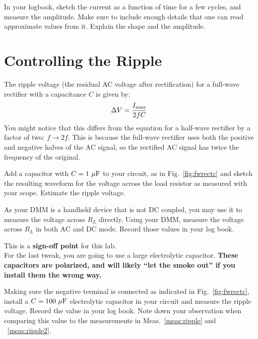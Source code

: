 \begin{measurement}
In your logbook, sketch the current as a function of time for a few
cycles, and measure the amplitude. Make sure to include enough details
that one can read approximate values from it.  Explain the shape and
the amplitude.
\end{measurement}


\section{Controlling the Ripple}

The ripple voltage (the residual AC voltage after rectification) 
for a full-wave rectifier with a capacitance $C$ is given by:
\begin{displaymath}
\Delta V = \frac{I_{\rm max}}{2 f C}
\end{displaymath}
You might notice that this differs from the equation for a half-wave
rectifier by a factor of two: $f \to 2 f$.  This is because the
full-wave rectifier uses both the positive and negative halves of the
AC signal, so the rectified AC signal has twice the frequency of the
original.

\begin{measurement} \label{meas:ripple}
Add a capacitor with $C=1~\rm{\mu F}$ to your circuit, as in Fig.~\ref{fig:fwrectc} and sketch the resulting waveform for the voltage across the load resistor as measured with your scope.  Estimate the ripple voltage.  \end{measurement}


\begin{measurement}  \label{meas:ripple2} As your DMM is a handheld device that is not DC coupled, you may use it to measure the voltage across $R_L$ directly.  Using your DMM, measure the voltage across $R_L$ in both AC and DC mode. Record those values in your log book. \end{measurement}

This is a \textbf{sign-off point} for this lab. \\

For the last tweak, you are going to use a large electrolytic
capacitor.  {\bf These capacitors are polarized, and will likely ``let
  the smoke out'' if you install them the wrong way.}  
 \begin{measurement}   Making sure the
negative terminal is connected as indicated in Fig.~\ref{fig:fwrectc},
install a $C=100~\rm \mu F$ electrolytic capacitor in your circuit and
measure the ripple voltage. Record the value in your log book. Note down your observation when comparing this value to the measurements in Meas.~\ref{meas:ripple} and ~\ref{meas:ripple2}. \end{measurement}

